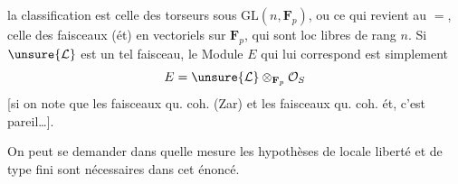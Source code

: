 la classification est celle des torseurs sous
$\mathrm{GL}(n,\mathbf F_p)$, ou ce qui revient au $=$, celle des
faisceaux (ét) en  vectoriels sur $\mathbf F_p$, qui
sont loc libres de rang $n$. Si $\unsure{\mathcal L}$ est un
tel faisceau, le Module $E$ qui lui
correspond est simplement
\[
E=\unsure{\mathcal L}\otimes_{\mathbf F_p}\mathcal O_S
\]
[si on note que les faisceaux qu. coh.
(Zar) et les faisceaux qu. coh. ét,
c'est pareil\ldots].

On peut se demander dans quelle mesure les
hypothèses de locale liberté et de type fini sont
nécessaires dans cet énoncé.
